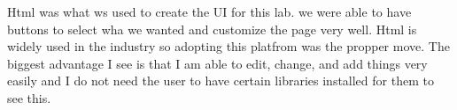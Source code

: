 Html was what ws used to create the U\+I for this lab. we were able to have buttons to select wha we wanted and customize the page very well. Html is widely used in the industry so adopting this platfrom was the propper move. The biggest advantage I see is that I am able to edit, change, and add things very easily and I do not need the user to have certain libraries installed for them to see this. 